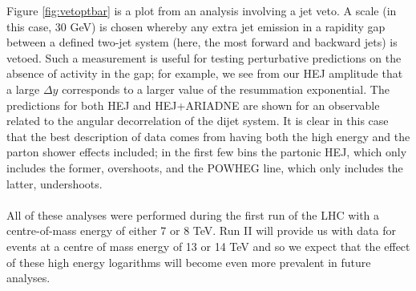 Figure \ref{fig:vetoptbar} is a plot from an analysis involving a jet veto. A scale (in this case, 30 GeV) is chosen whereby any extra jet emission in a rapidity gap between a defined two-jet system (here, the most forward and backward jets) is vetoed. Such a measurement is useful for testing perturbative predictions on the absence of activity in the gap; for example, we see from our HEJ amplitude that a large $\Delta y$ corresponds to a larger value of the resummation exponential. The predictions for both HEJ and HEJ+ARIADNE are shown for an observable related to the angular decorrelation of the dijet system. It is clear in this case that the best description of data comes from having both the high energy and the parton shower effects included; in the first few bins the partonic HEJ, which only includes the former, overshoots, and the POWHEG line, which only includes the latter, undershoots. \\
\\
All of these analyses were performed during the first run of the LHC with a centre-of-mass energy of either 7 or 8 TeV. Run II will provide us with data for events at a centre of mass energy of 13 or 14 TeV and so we expect that the effect of these high energy logarithms will become even more prevalent in future analyses. 
